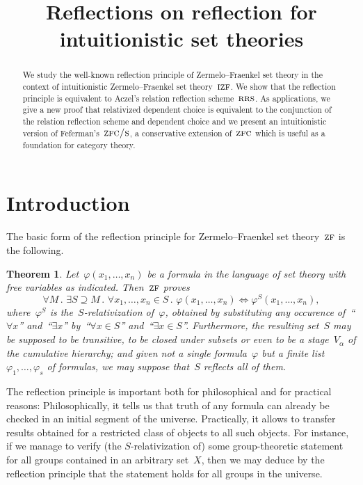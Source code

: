 \documentclass[oneside,reqno]{amsart}
\title[]{Reflections on reflection for \\ intuitionistic set theories}
\author{}
\theoremstyle{definition}
\theoremstyle{plain}
\newtheorem{thm}[defn]{Theorem}
\theoremstyle{remark}
\renewcommand{\_}{\mathpunct{.}\,}
\newcommand{\?}{\,{:}\,}
\newcommand{\ZF}{\textsc{zf}}
\newcommand{\IZF}{\textsc{izf}}
\newcommand{\ZFC}{\textsc{zfc}}
\newcommand{\ZFCS}{\textsc{zfc/s}}
\newcommand{\RRS}{\textsc{rrs}}
\begin{document}
\begin{abstract}
  We study the well-known reflection principle of Zermelo--Fraenkel set theory
  in the context of intuitionistic Zermelo--Fraenkel set theory~$\IZF$. We show
  that the reflection principle is equivalent to Aczel's relation reflection scheme~$\RRS$. As
  applications, we give a new proof that relativized dependent choice is
  equivalent to the conjunction of the relation reflection scheme and dependent
  choice and we present an intuitionistic version of Feferman's~$\ZFCS$, a
  conservative extension of~$\ZFC$ which is useful as a foundation for category
  theory.
\end{abstract}

\maketitle
\thispagestyle{empty}

\section{Introduction}

The basic form of the reflection principle for Zermelo--Fraenkel set
theory~$\ZF$ is the following.
\begin{thm}Let~$\varphi(x_1,\ldots,x_n)$ be a formula in the language of set
theory with free variables as indicated. Then~$\ZF$ proves
\[ \forall M\_
  \exists S \supseteq M\_
  \forall x_1,\ldots,x_n \in S\_
  \varphi(x_1,\ldots,x_n) \Leftrightarrow \varphi^S(x_1,\ldots,x_n), \]
where~$\varphi^S$ is the~$S$-relativization of~$\varphi$, obtained by
substituting any occurence of~``$\forall x$'' and~``$\exists x$'' by~``$\forall
x \in S$'' and~``$\exists x \in S$''.
Furthermore, the resulting set~$S$ may be supposed to be transitive, to be closed
under subsets or even to be a stage~$V_\alpha$ of the cumulative hierarchy;
and given not a single formula~$\varphi$ but a finite
list~$\varphi_1,\ldots,\varphi_s$ of formulas, we may suppose that~$S$ reflects
all of them.
\end{thm}

The reflection principle is important both for philosophical and for practical
reasons: Philosophically, it tells us that truth of any formula can already be
checked in an initial segment of the universe. Practically, it allows to
transfer results obtained for a restricted class of objects to all such
objects. For instance, if we manage to verify (the $S$-relativization of) some
group-theoretic statement for all groups contained in an arbitrary set~$X$,
then we may deduce by the reflection principle that the statement holds
for all groups in the universe.
\end{document}
